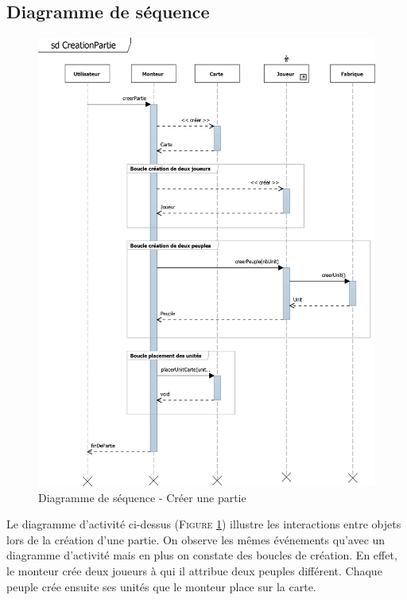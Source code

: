 \documentclass[a4paper,11pt]{article}
\begin{document}
\subsection{Diagramme de séquence}
\begin{figure}[ht!]
\includegraphics{sqCreerPartie.png}
\caption{Diagramme de séquence - Créer une partie}
\label{fig:seqcreer}
\end{figure}
\vspace*{1cm}
Le diagramme d'activité ci-dessus (\textsc{Figure \ref{fig:seqcreer}}) illustre les interactions entre objets lors de la création d'une partie. On observe les mêmes événements qu'avec un diagramme d'activité mais en plus on constate des boucles de création. En effet, le monteur crée deux joueurs à qui il attribue deux peuples différent. Chaque peuple crée ensuite ses unités que le monteur place sur la carte.
\newpage 
\end{document}
